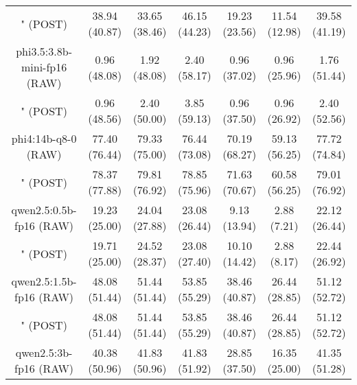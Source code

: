 \begin{table}[]
{\begin{tabular}{ccccccc}
      \multicolumn{1}{c|}{" (POST)} & 38.94 (40.87) & 33.65 (38.46) & \multicolumn{1}{c|}{46.15 (44.23)} & 19.23 (23.56) & \multicolumn{1}{c|}{11.54 (12.98)} & 39.58 (41.19) \\
      \cline{1-7}

      \multicolumn{1}{c|}{phi3.5:3.8b-mini-fp16 (RAW)} & 0.96 (48.08) & 1.92 (48.08) & \multicolumn{1}{c|}{2.40 (58.17)} & 0.96 (37.02) & \multicolumn{1}{c|}{0.96 (25.96)} & 1.76 (51.44) \\

      \multicolumn{1}{c|}{" (POST)} & 0.96 (48.56) & 2.40 (50.00) & \multicolumn{1}{c|}{3.85 (59.13)} & 0.96 (37.50) & \multicolumn{1}{c|}{0.96 (26.92)} & 2.40 (52.56) \\
      \cline{1-7}

      \multicolumn{1}{c|}{phi4:14b-q8-0 (RAW)} & 77.40 (76.44) & 79.33 (75.00) & \multicolumn{1}{c|}{76.44 (73.08)} & 70.19 (68.27) & \multicolumn{1}{c|}{59.13 (56.25)} & 77.72 (74.84) \\

      \multicolumn{1}{c|}{" (POST)} & 78.37 (77.88) & 79.81 (76.92) & \multicolumn{1}{c|}{78.85 (75.96)} & 71.63 (70.67) & \multicolumn{1}{c|}{60.58 (56.25)} & 79.01 (76.92) \\
      \cline{1-7}

      \multicolumn{1}{c|}{qwen2.5:0.5b-fp16 (RAW)} & 19.23 (25.00) & 24.04 (27.88) & \multicolumn{1}{c|}{23.08 (26.44)} & 9.13 (13.94) & \multicolumn{1}{c|}{2.88 (7.21)} & 22.12 (26.44) \\

      \multicolumn{1}{c|}{" (POST)} & 19.71 (25.00) & 24.52 (28.37) & \multicolumn{1}{c|}{23.08 (27.40)} & 10.10 (14.42) & \multicolumn{1}{c|}{2.88 (8.17)} & 22.44 (26.92) \\
      \cline{1-7}

      \multicolumn{1}{c|}{qwen2.5:1.5b-fp16 (RAW)} & 48.08 (51.44) & 51.44 (51.44) & \multicolumn{1}{c|}{53.85 (55.29)} & 38.46 (40.87) & \multicolumn{1}{c|}{26.44 (28.85)} & 51.12 (52.72) \\

      \multicolumn{1}{c|}{" (POST)} & 48.08 (51.44) & 51.44 (51.44) & \multicolumn{1}{c|}{53.85 (55.29)} & 38.46 (40.87) & \multicolumn{1}{c|}{26.44 (28.85)} & 51.12 (52.72) \\
      \cline{1-7}

      \multicolumn{1}{c|}{qwen2.5:3b-fp16 (RAW)} & 40.38 (50.96) & 41.83 (50.96) & \multicolumn{1}{c|}{41.83 (51.92)} & 28.85 (37.50) & \multicolumn{1}{c|}{16.35 (25.00)} & 41.35 (51.28) \\


\end{tabular}}
\end{table}
